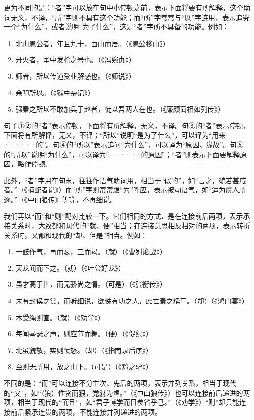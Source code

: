 更为不同的是：“者”字可以放在句中小停顿之前，表示下面将要有所解释，这个助词无义，不译，“所”字则不具有这个功能；而“所”字常常与“以”字连用，表示追究一个“为什么”，或者说明“为了什么”，这是“者”字所不具备的功能。例如：
\begin{enumerate}[label=\textcircled{\arabic*}]
	\item 北山愚公者，年且九十，面山而居。（《愚公移山》）
	\item 开火者，军中发枪之号也。（《冯婉贞》）
	\item 师者，所以传道受业解惑也。（《师说》）
	\item 余叩所以。（《狱中杂记》）
	\item 强秦之所以不敢加兵于赵者，徒以吾两人在也。（《廉颇蔺相如列传》）
\end{enumerate}

句子①②的“者”表示停顿，下面将有所解释，无义，不译。句③的“者”表示停顿，下面将有所解释，无义，不译；“所以”说明“是为了什么”，可以译为“用来······的”。句④的“所以”表示追问“为什么”，可以译为“原因、缘故”。句⑤的“所以”说明“为什么”，可以译为“······的原因”；“者”则表示下面要解释原因，略作停顿。

此外，“者”字用在句末，往往作语气助词用，相当于“似的”，如“言之，貌若甚戚者。”（《捕蛇者说》）而“所”字则常常跟“为”呼应，表示被动语气，如“适为虞人所逐。”（《中山狼传》等等，不再细说。

我们再以“而”和“则”配对比较一下。它们相同的方式，是在连接前后两项，表示承接关系时，大致都和现代的“就、便”相当；在连接意思相反相对的两项，表示转折关系时，又都和现代的“却、但是”相当。例如：
\begin{enumerate}[label=\textcircled{\arabic*}]
	\item 一鼓作气，再而衰，三而竭。（就）（《曹刿论战》）
	\item 天龙闻而下之。（就）（《叶公好龙》）
	\item 虽才高于世，而无骄尚之情。（可是）（《张衡传》）
	\item 未有封侯之赏，而听细说，欲诛有功之人，此亡秦之续耳。（却）（《鸿门宴》）
	\item 木受绳则直。（就）（《劝学》）
	\item 每闻琴瑟之声，则应节而舞。（便）（《促织》）
	\item 北虽貌敬，实则愤怒。（却）（《指南录后序》）
	\item 至则无所用，放之山下。（可是）（《黔之驴》）
\end{enumerate}

不同的是：“而”可以连接不分主次、先后的两项，表示并列关系，相当于现代的“又”，如“（狼）性贪而狠，党豺为虐。”（《中山狼传》）也可以连接前后递进的两项，相当于现代的“而且”，如“君子博学而日参省乎己。”（《劝学》）“则”却只能连接前后紧承连贯的两项，不能连接并列递进的两项。

